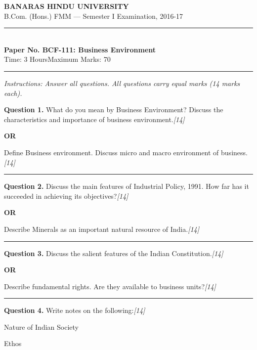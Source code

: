 \documentclass[11pt,a4paper]{article}
\newcommand{\pts}[1]{\hfill   \textit{[#1]}}
\begin{document}
\begin{center}
  {\large\bfseries BANARAS HINDU UNIVERSITY}\\[2pt]
  {\normalsize B.Com. (Hons.) FMM --- Semester I Examination, 2016-17}\\[6pt]
  \rule{0.8\linewidth}{0.5pt}\\[6pt]
  {\large\bfseries Paper No. BCF-111: Business Environment}\\[4pt]
  {\normalsize Time: 3 Hours\hfill Maximum Marks: 70}
\end{center}

\rule{\linewidth}{0.4pt}

\smallskip



\noindent   \textit{Instructions: Answer all questions. All questions carry equal marks (14 marks each).}

\bigskip




\noindent   \textbf{Question 1.}
What do you mean by Business Environment? Discuss the characteristics and importance of business environment.\pts{14}

\centerline{   \textbf{OR}}

Define Business environment. Discuss micro and macro environment of business.\pts{14}

\medskip\rule{\linewidth}{0.2pt}




\noindent   \textbf{Question 2.}
Discuss the main features of Industrial Policy, 1991. How far has it succeeded in achieving its objectives?\pts{14}

\centerline{   \textbf{OR}}

Describe Minerals as an important natural resource of India.\pts{14}

\medskip\rule{\linewidth}{0.2pt}




\noindent   \textbf{Question 3.}
Discuss the salient features of the Indian Constitution.\pts{14}

\centerline{   \textbf{OR}}

Describe fundamental rights. Are they available to business units?\pts{14}

\medskip\rule{\linewidth}{0.2pt}




\noindent   \textbf{Question 4.}
Write notes on the following:\pts{14}

\begin{parts}
  \item Nature of Indian Society
  \item Ethos
\end{parts}
\end{document}
